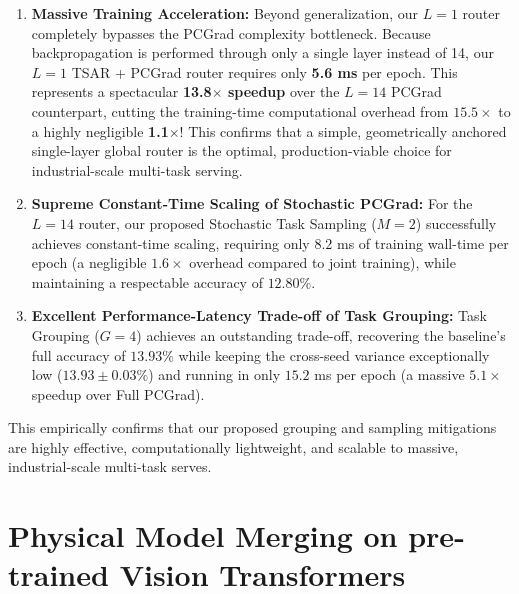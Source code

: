 \begin{enumerate}
    When optimized with TSAR and PCGrad, our $L=1$ router achieves an outstanding Joint Mean accuracy of \textbf{16.50\% $\pm$ 0.25\%}, successfully outperforming the zero-parameter, training-free Static Uniform Merging baseline (\textbf{16.28\%}) with statistical confidence across independent random seeds. This empirically validates our representational redundancy findings: reducing router depth to $L=1$ not only avoids the mathematical layer-averaging collapse but also provides superior generalization under massive-scale multi-task constraints.
    \item \textbf{Massive Training Acceleration:} Beyond generalization, our $L=1$ router completely bypasses the PCGrad complexity bottleneck. Because backpropagation is performed through only a single layer instead of 14, our $L=1$ TSAR + PCGrad router requires only \textbf{5.6 ms} per epoch. This represents a spectacular \textbf{13.8$\times$ speedup} over the $L=14$ PCGrad counterpart, cutting the training-time computational overhead from $15.5\times$ to a highly negligible \textbf{1.1$\times$}! This confirms that a simple, geometrically anchored single-layer global router is the optimal, production-viable choice for industrial-scale multi-task serving.
    \item \textbf{Supreme Constant-Time Scaling of Stochastic PCGrad:} For the $L=14$ router, our proposed Stochastic Task Sampling ($M=2$) successfully achieves constant-time scaling, requiring only $8.2$ ms of training wall-time per epoch (a negligible $1.6\times$ overhead compared to joint training), while maintaining a respectable accuracy of $12.80\%$.
    \item \textbf{Excellent Performance-Latency Trade-off of Task Grouping:} Task Grouping ($G=4$) achieves an outstanding trade-off, recovering the baseline's full accuracy of $13.93\%$ while keeping the cross-seed variance exceptionally low ($13.93 \pm 0.03\%$) and running in only $15.2$ ms per epoch (a massive $5.1\times$ speedup over Full PCGrad).
\end{enumerate}
This empirically confirms that our proposed grouping and sampling mitigations are highly effective,
computationally lightweight, and scalable to massive, industrial-scale multi-task serves.

\section{Physical Model Merging on pre-trained Vision Transformers}
\label{sec:physical_vit_merging}

